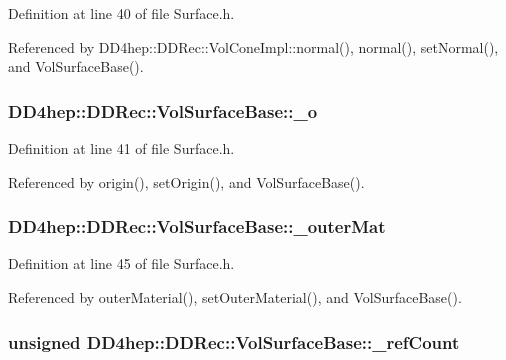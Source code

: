 Definition at line 40 of file Surface.h.

Referenced by DD4hep::DDRec::VolConeImpl::normal(), normal(), setNormal(), and VolSurfaceBase().\hypertarget{class_d_d4hep_1_1_d_d_rec_1_1_vol_surface_base_a2a59cf024e571ecddb719beadca6aa5e}{
\subsubsection[{\_\-o}]{ {\bf DD4hep::DDRec::VolSurfaceBase::\_\-o}}}
\label{class_d_d4hep_1_1_d_d_rec_1_1_vol_surface_base_a2a59cf024e571ecddb719beadca6aa5e}


Definition at line 41 of file Surface.h.

Referenced by origin(), setOrigin(), and VolSurfaceBase().\hypertarget{class_d_d4hep_1_1_d_d_rec_1_1_vol_surface_base_a3745bfba5f2d3b296e4f628c399faa39}{
\subsubsection[{\_\-outerMat}]{ {\bf DD4hep::DDRec::VolSurfaceBase::\_\-outerMat}}}
\label{class_d_d4hep_1_1_d_d_rec_1_1_vol_surface_base_a3745bfba5f2d3b296e4f628c399faa39}


Definition at line 45 of file Surface.h.

Referenced by outerMaterial(), setOuterMaterial(), and VolSurfaceBase().\hypertarget{class_d_d4hep_1_1_d_d_rec_1_1_vol_surface_base_a89b8556764cf2684ba0f96dfdd6a674e}{
\subsubsection[{\_\-refCount}]{\setlength{\rightskip}{0pt plus 5cm}unsigned {\bf DD4hep::DDRec::VolSurfaceBase::\_\-refCount}}}
\label{class_d_d4hep_1_1_d_d_rec_1_1_vol_surface_base_a89b8556764cf2684ba0f96dfdd6a674e}


